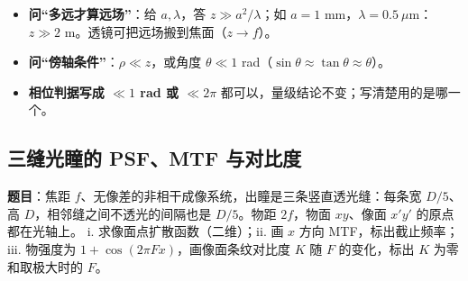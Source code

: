 \begin{warn}[变式]
\begin{itemize}
\item \textbf{问“多远才算远场”}：给 $a,\lambda$，答 $z\gg a^2/\lambda$；如 $a=1$ mm，$\lambda=0.5\ \mu$m：$z\gg2$ m。透镜可把远场搬到焦面（$z\to f$）。
\item \textbf{问“傍轴条件”}：$\rho\ll z$，或角度 $\theta\ll1$ rad（$\sin\theta\approx\tan\theta\approx\theta$）。
\item \textbf{相位判据写成 $\ll1$ rad 或 $\ll2\pi$} 都可以，量级结论不变；写清楚用的是哪一个。
\end{itemize}
\end{warn}

\subsection{三缝光瞳的 PSF、MTF 与对比度}\label{ex:v-3slit}
\noindent\textbf{题目}：焦距 $f$、无像差的非相干成像系统，出瞳是三条竖直透光缝：每条宽 $D/5$、高 $D$，相邻缝之间不透光的间隔也是 $D/5$。物距 $2f$，物面 $xy$、像面 $x'y'$ 的原点都在光轴上。
i. 求像面点扩散函数（二维）；ii. 画 $x$ 方向 MTF，标出截止频率；iii. 物强度为 $1+\cos(2\pi Fx)$，画像面条纹对比度 $K$ 随 $F$ 的变化，标出 $K$ 为零和取极大时的 $F$。

